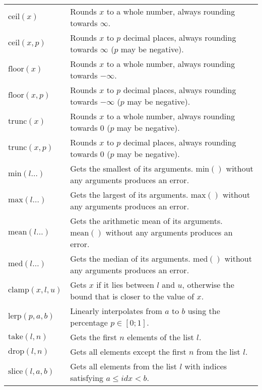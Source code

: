 \documentclass[10pt]{article}
\newcommand{\tabgap}{\vspace{3mm}\\}
\begin{document}
\begin{longtable}{p{}p{}}
        $ \mathrm{ceil}(x) $                       & Rounds $ x $ to a whole number, always rounding towards $ \infty $. \\
        $ \mathrm{ceil}(x, p) $                    & Rounds $ x $ to $ p $ decimal places, always rounding towards $ \infty $ ($ p $ may be negative). \\
        $ \mathrm{floor}(x) $                      & Rounds $ x $ to a whole number, always rounding towards $ -\infty $. \\
        $ \mathrm{floor}(x, p) $                   & Rounds $ x $ to $ p $ decimal places, always rounding towards $ -\infty $ ($ p $ may be negative). \\
        $ \mathrm{trunc}(x) $                      & Rounds $ x $ to a whole number, always rounding towards $ 0 $ ($ p $ may be negative). \\
        $ \mathrm{trunc}(x, p) $                   & Rounds $ x $ to $ p $ decimal places, always rounding towards $ 0 $ ($ p $ may be negative). \tabgap
        $ \mathrm{min}(l\dots) $                   & Gets the smallest of its arguments. $ \mathrm{min}() $ without any arguments produces an error. \\
        $ \mathrm{max}(l\dots) $                   & Gets the largest of its arguments. $ \mathrm{max}() $ without any arguments produces an error. \\
        $ \mathrm{mean}(l\dots) $                  & Gets the arithmetic mean of its arguments. $ \mathrm{mean}() $ without any arguments produces an error. \\
        $ \mathrm{med}(l\dots) $                   & Gets the median of its arguments. $ \mathrm{med}() $ without any arguments produces an error. \tabgap
        $ \mathrm{clamp}(x, l, u) $                & Gets $ x $ if it lies between $ l $ and $ u $, otherwise the bound that is closer to the value of $ x $. \\
        $ \mathrm{lerp}(p, a, b) $                 & Linearly interpolates from $ a $ to $ b $ using the percentage $ p \in [0;1] $. \tabgap
        $ \mathrm{take}(l, n) $                    & Gets the first $ n $ elements of the list $ l $. \\
        $ \mathrm{drop}(l, n) $                    & Gets all elements except the first $ n $ from the list $ l $. \\
        $ \mathrm{slice}(l, a, b) $                & Gets all elements from the list $ l $ with indices satisfying $ a \leq idx < b $. \\

\end{longtable}
\end{document}
